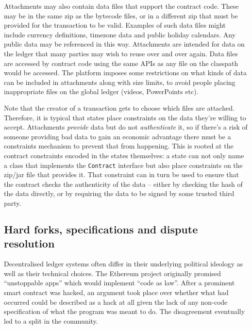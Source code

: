 \documentclass{article}
\begin{document}
Attachments may also contain data files that support the contract code. These may be in the same zip as the
bytecode files, or in a different zip that must be provided for the transaction to be valid. Examples of such
data files might include currency definitions, timezone data and public holiday calendars. Any public data may
be referenced in this way. Attachments are intended for data on the ledger that many parties may wish to reuse
over and over again. Data files are accessed by contract code using the same APIs as any file on the classpath
would be accessed. The platform imposes some restrictions on what kinds of data can be included in attachments
along with size limits, to avoid people placing inappropriate files on the global ledger (videos, PowerPoints etc).


Note that the creator of a transaction gets to choose which files are attached. Therefore, it is typical that
states place constraints on the data they're willing to accept. Attachments \emph{provide} data but do not
\emph{authenticate} it, so if there's a risk of someone providing bad data to gain an economic advantage
there must be a constraints mechanism to prevent that from happening. This is rooted at the contract constraints
encoded in the states themselves: a state can not only name a class that implements the \texttt{Contract}
interface but also place constraints on the zip/jar file that provides it. That constraint can in turn be used to
ensure that the contract checks the authenticity of the data -- either by checking the hash of the data directly,
or by requiring the data to be signed by some trusted third party.


\subsection{Hard forks, specifications and dispute resolution}

Decentralised ledger systems often differ in their underlying political ideology as well as their technical
choices. The Ethereum project originally promised ``unstoppable apps'' which would implement ``code as law''. After
a prominent smart contract was hacked\cite{TheDAOHack}, an argument took place over whether what had occurred could be described
as a hack at all given the lack of any non-code specification of what the program was meant to do. The disagreement
eventually led to a split in the community.
\end{document}
